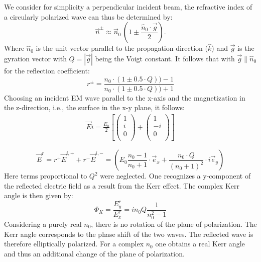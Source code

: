 We consider for simplicity a perpendicular incident beam, the refractive index of a circularly polarized wave can thus be determined by:
\begin{equation}
    \Vec{n}^{\pm} \approx \Vec{n}_0\,\left (1\pm\frac{\hat{n}_0\cdot\Vec{g}}{2} \right).
\end{equation}
Where $\hat{n}_0$ is the unit vector parallel to the propagation direction ($\hat{k}$) and $\Vec{g}$ is the gyration vector with $Q = |\Vec{g}|$ being the Voigt constant. It follows that with $\Vec{g}\parallel \hat{n}_0$ for the reflection coefficient:
\begin{equation}
    r^{\pm} = \frac{n_0\cdot(1\pm0.5\cdot Q))-1}{n_0\cdot(1\pm0.5\cdot Q))+1}
\end{equation}
Choosing an incident EM wave parallel to the x-axis and the magnetization in the z-direction, i.e., the surface in the x-y plane, it follows:
\begin{align}
    \Vec{E}i= \frac{E_0}{2}
    \left [
    \left (
    \begin{array}{c}
          1\\
          i\\
          0\\
    \end{array}
    \right )
    +
    \left (
    \begin{array}{c}
          1\\
         -i\\
          0\\
    \end{array}
    \right )
    \right ] 
\end{align}

\begin{equation}
    \Vec{E}^r=r^+\Vec{E}^{i,+}+r^-\Vec{E}^{i,-}=\left ( E_0 \frac{n_0-1}{n_0+1}\cdot \Vec{e}_x + \frac{n_0\cdot Q}{(n_0+1)^2} \cdot i\Vec{e}_y \right )
\end{equation}
Here terms proportional to $Q^2$ were neglected. One recognizes a y-component of the reflected electric field as a result from the Kerr effect. The complex Kerr angle is then given by:
\begin{equation}
    \Phi_K = \frac{E^r_y}{E^r_x} = in_0Q\frac{1}{n_0^2-1}
    \label{eq:phi-kerr}
\end{equation}
Considering a purely real $n_0$, there is no rotation of the plane of polarization. The Kerr angle corresponds to the phase shift of the two waves. The reflected wave is therefore elliptically polarized. For a complex $n_0$ one obtains a real Kerr angle and thus an additional change of the plane of polarization.



